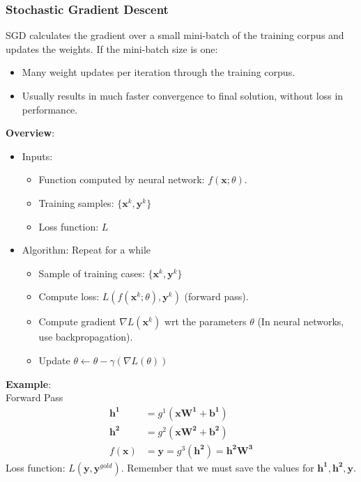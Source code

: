 \documentclass{article}
\begin{document}
\subsubsection{Stochastic Gradient Descent}
SGD calculates the gradient over a small mini-batch of the training corpus and updates the weights. If the mini-batch size is one:
\begin{itemize}
    \item Many weight updates per iteration through the training corpus.
    \item Usually results in much faster convergence to final solution, without loss in performance.
\end{itemize}
\textbf{Overview}:
\begin{itemize}
    \item Inputs:
    \begin{itemize}
        \item Function computed by neural network: $f(\mathbf{x}; \theta)$.
        \item Training samples: $\{\mathbf{x}^k,\mathbf{y}^k\}$
        \item Loss function: $L$
    \end{itemize}
    \item Algorithm: Repeat for a while
    \begin{itemize}
        \item Sample of training cases: $\{\mathbf{x}^k,\mathbf{y}^k\}$
        \item Compute loss: $L(f(\mathbf{x}^k; \theta), \mathbf{y}^k)$ (forward pass).
        \item Compute gradient $\nabla L(\mathbf{x}^k)$ wrt the parameters $\theta$ (In neural networks, use backpropagation).
        \item Update $\theta \leftarrow \theta - \gamma(\nabla L(\theta))$
    \end{itemize}
\end{itemize}
\textbf{Example}:\\
Forward Pass
\begin{align*}
    \mathbf{h^1} &= g^1(\mathbf{xW^1} + \mathbf{b^1})\\
    \mathbf{h^2} &= g^2(\mathbf{xW^2} + \mathbf{b^2})\\
    f(\mathbf{x}) &= \mathbf{y} = g^3(\mathbf{h^2}) = \mathbf{h^2W^3}
\end{align*}
Loss function: $L(\mathbf{y},\mathbf{y}^{gold})$. Remember that we must save the values for $\mathbf{h^1}, \mathbf{h^2}, \mathbf{y}$.\\
\end{document}
